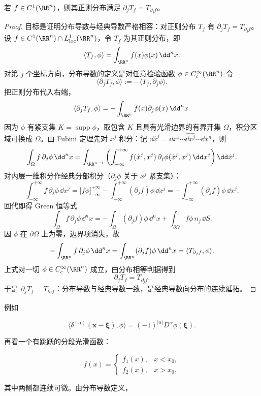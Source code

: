 \begin{proposition}[分布导数与经典导数的相容性]
若 $f\in C^1(\RR^n)$，则其正则分布满足 $\partial_jT_f=T_{\partial_jf}$。
\end{proposition}
\begin{proof}
目标是证明分布导数与经典导数严格相容：对正则分布 $T_f$ 有 $\partial_jT_f=T_{\partial_jf}$。设 $f\in C^1(\RR^n)\cap L^1_{\mathrm{loc}}(\RR^n)$，令 $T_f$ 为其正则分布，即
\[
\langle T_f,\phi\rangle=\int_{\RR^n}f(x)\phi(x)\,\dd^nx.
\]
对第 $j$ 个坐标方向，分布导数的定义是对任意检验函数 $\phi\in C_c^\infty(\RR^n)$ 令
\[
\langle \partial_jT_f,\phi\rangle
:=-\langle T_f,\partial_j\phi\rangle.
\]
把正则分布代入右端，
\[
\langle \partial_jT_f,\phi\rangle
=-\int_{\RR^n}f(x)\partial_j\phi(x)\,\dd^nx.
\]
因为 $\phi$ 有紧支集 $K=\operatorname{supp}\phi$，取包含 $K$ 且具有光滑边界的有界开集 $\Omega$，积分区域可换成 $\Omega$。由 Fubini 定理先对 $x^j$ 积分：记 $\dd\hat x^j=\dd x^1\cdots\widehat{\dd x^j}\cdots\dd x^n$，则
\[
\int_\Omega f\,\partial_j\phi\,\dd^nx
=\int_{\RR^{n-1}}
\left(
\int_{-\infty}^{+\infty} f(\hat x^j,x^j)\,\partial_j\phi(\hat x^j,x^j)\,\dd x^j
\right)
\dd\hat x^j.
\]
对内层一维积分作经典分部积分（$\partial_j\phi$ 关于 $x^j$ 紧支集）：
\[
\int_{-\infty}^{+\infty} f\,\partial_j\phi\,\dd x^j
=\bigl[f\phi\bigr]_{-\infty}^{+\infty}
-\int_{-\infty}^{+\infty}(\partial_jf)\phi\,\dd x^j
=-\int_{-\infty}^{+\infty}(\partial_jf)\phi\,\dd x^j.
\]
回代即得 Green 恒等式
\[
\int_\Omega f\,\partial_j\phi\,\dd^nx
=-\int_\Omega(\partial_jf)\phi\,\dd^nx
+\int_{\partial\Omega}f\phi\,n_j\,\dd S.
\]
因 $\phi$ 在 $\partial\Omega$ 上为零，边界项消失，故
\[
-\int_{\RR^n} f\,\partial_j\phi\,\dd^nx
=\int_{\RR^n}(\partial_jf)\phi\,\dd^nx
=\langle T_{\partial_jf},\phi\rangle.
\]
上式对一切 $\phi\in C_c^\infty(\RR^n)$ 成立，由分布相等判据得到
\[
\partial_jT_f=T_{\partial_jf}.
\]
于是 $\partial_jT_f=T_{\partial_jf}$：分布导数与经典导数一致，是经典导数向分布的连续延拓。
\end{proof}


例如

\[
\langle\delta^{(\alpha)}(\mathbf x-\boldsymbol\xi),\phi\rangle
=(-1)^{|\alpha|}D^\alpha\phi(\boldsymbol\xi).
\]

再看一个有跳跃的分段光滑函数：

\[
f(x)=
\begin{cases}
f_1(x),&x<x_0,\\
f_2(x),&x>x_0,
\end{cases}
\]

其中两侧都连续可微。由分布导数定义，

